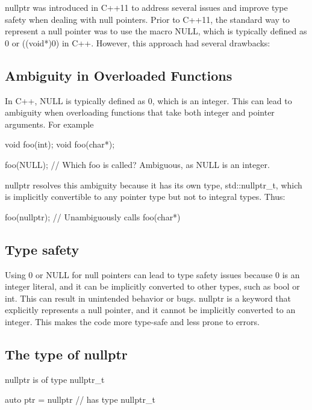 \documentclass{report}
\begin{document}
    \pagebreak 
    \bigbreak \noindent 
    nullptr was introduced in C++11 to address several issues and improve type safety when dealing with null pointers. Prior to C++11, the standard way to represent a null pointer was to use the macro NULL, which is typically defined as 0 or ((void*)0) in C++. However, this approach had several drawbacks:
    \bigbreak \noindent 
    \subsection{Ambiguity in Overloaded Functions}
    \bigbreak \noindent 
    In C++, NULL is typically defined as 0, which is an integer. This can lead to ambiguity when overloading functions that take both integer and pointer arguments. For example
    \bigbreak \noindent 
    \begin{cppcode}
        void foo(int);
        void foo(char*);

        foo(NULL); // Which foo is called? Ambiguous, as NULL is an integer.
    \end{cppcode}
    \bigbreak \noindent 
    nullptr resolves this ambiguity because it has its own type, std::nullptr\_t, which is implicitly convertible to any pointer type but not to integral types. Thus:
    \bigbreak \noindent 
    \begin{cppcode}
        foo(nullptr); // Unambiguously calls foo(char*)
    \end{cppcode}

    \bigbreak \noindent 
    \subsection{Type safety}
    \bigbreak \noindent 
    Using 0 or NULL for null pointers can lead to type safety issues because 0 is an integer literal, and it can be implicitly converted to other types, such as bool or int. This can result in unintended behavior or bugs.
    \bigbreak \noindent 
    nullptr is a keyword that explicitly represents a null pointer, and it cannot be implicitly converted to an integer. This makes the code more type-safe and less prone to errors.
    \bigbreak \noindent 
    \subsection{The type of nullptr}
    \bigbreak \noindent 
    nullptr is of type nullptr\_t
    \bigbreak \noindent 
    \begin{cppcode}
    auto ptr = nullptr // has type nullptr\_t
    \end{cppcode}
\end{document}
